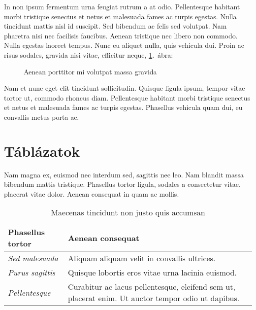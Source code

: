 In non ipsum fermentum urna feugiat rutrum a at odio. Pellentesque habitant morbi tristique senectus et netus et malesuada fames ac turpis egestas. Nulla tincidunt mattis nisl id suscipit. Sed bibendum ac felis sed volutpat. Nam pharetra nisi nec facilisis faucibus. Aenean tristique nec libero non commodo. Nulla egestas laoreet tempus. Nunc eu aliquet nulla, quis vehicula dui. Proin ac risus sodales, gravida nisi vitae, efficitur neque, \ref{fig:example-2}.~ábra:

\begin{figure}[H]
	\centering
	\hspace{5pt}
	\caption{Aenean porttitor mi volutpat massa gravida}
	\label{fig:example-2}
\end{figure}

Nam et nunc eget elit tincidunt sollicitudin. Quisque ligula ipsum, tempor vitae tortor ut, commodo rhoncus diam. Pellentesque habitant morbi tristique senectus et netus et malesuada fames ac turpis egestas. Phasellus vehicula quam dui, eu convallis metus porta ac.


\section{Táblázatok}

Nam magna ex, euismod nec interdum sed, sagittis nec leo. Nam blandit massa bibendum mattis tristique. Phasellus tortor ligula, sodales a consectetur vitae, placerat vitae dolor. Aenean consequat in quam ac mollis. 

\begin{table}[H]
	\centering
	\begin{tabular}{ | m{} | m{} | }
		\hline
		\textbf{Phasellus tortor} & \textbf{Aenean consequat} \\
		\hline \hline
		\emph{Sed malesuada} & Aliquam aliquam velit in convallis ultrices. \\
		\hline
		\emph{Purus sagittis} &  Quisque lobortis eros vitae urna lacinia euismod. \\
		\hline
		\emph{Pellentesque} & Curabitur ac lacus pellentesque, eleifend sem ut, placerat enim. Ut auctor tempor odio ut dapibus. \\
		\hline
	\end{tabular}
	\caption{Maecenas tincidunt non justo quis accumsan}
	\label{tab:example-1}
\end{table}

